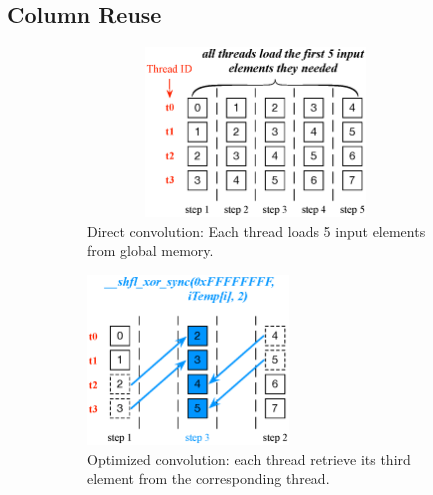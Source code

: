 
\subsection{Column Reuse}
\label{sec:creuse}
\begin{figure}[t!]
	\begin{subfigure}{0.33\textwidth}
		\centering
		\captionsetup{width=0.9\textwidth}
		 \includegraphics[width=0.98\textwidth,height=4.5cm]{./figure/directconv.eps}
		 \caption{Direct convolution: Each thread loads 5 input elements from global memory.}
		 \label{fig:directalgo}
	\end{subfigure}
	\begin{subfigure}{0.3\textwidth}
		\centering
		\captionsetup{width=0.9\textwidth}
		 \includegraphics[width=\textwidth,height=4.5cm]{./figure/optalgo1.eps}
		 \caption{Optimized convolution: each thread retrieve its third element from the corresponding thread.}
		 \label{fig:optalgo1}
	\end{subfigure}
	\begin{subfigure}{0.3\textwidth}
		\centering
		\captionsetup{width=0.9\textwidth}


\end{subfigure}
\end{figure}
